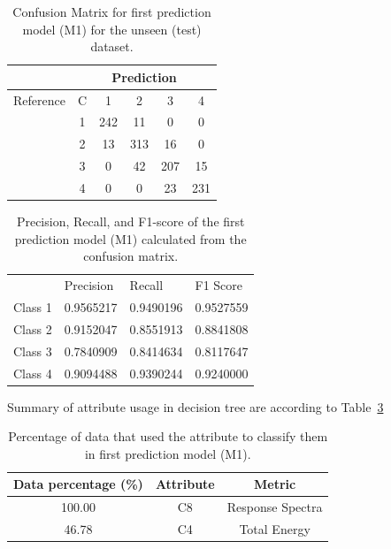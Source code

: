 \begin{table}
\centering
\caption{Confusion Matrix for first prediction model (M1) for the unseen (test) dataset.}
\begin{tabular}{cccccc}
\hline
                           & \multicolumn{5}{c}{Prediction} \\ \hline
{Reference}         & C    & 1      & 2      & 3      & 4       \\
                            & 1     & 242  & 11    & 0      & 0    \\
                            & 2     & 13    & 313  & 16    & 0    \\
                            & 3     & 0      & 42    & 207  & 15   \\
                            & 4     & 0      & 0      & 23    & 231  \\ \hline
\end{tabular}
\label{tab:confusionmat_test_1}
\end{table}


\begin{table}
\centering
\caption{Precision, Recall, and F1-score of the first prediction model (M1) calculated from the confusion matrix.}
\begin{tabular}{llll}
\hline
        & Precision & Recall  & F1 Score \\ \cline{2-4} 
Class 1 & 0.9565217 & 0.9490196 & 0.9527559 \\
Class 2 & 0.9152047 & 0.8551913 & 0.8841808 \\
Class 3 & 0.7840909 & 0.8414634 & 0.8117647 \\
Class 4 & 0.9094488 & 0.9390244 & 0.9240000 \\ \hline
\end{tabular}
\label{tab:prec_recall_test_1}
\end{table}







Summary of attribute usage in decision tree are according to Table~\ref{tab:attribute_usage_1}

\begin{table}
\centering
\caption{Percentage of data that used the attribute to classify them in first prediction model (M1).}
\begin{tabular}{ccc}
\hline
Data percentage (\%) & Attribute & Metric                \\ \hline
100.00               & C8        & Response Spectra      \\
46.78                 & C4        & Total Energy         \\ \hline
\end{tabular}
\label{tab:attribute_usage_1}
\end{table}

